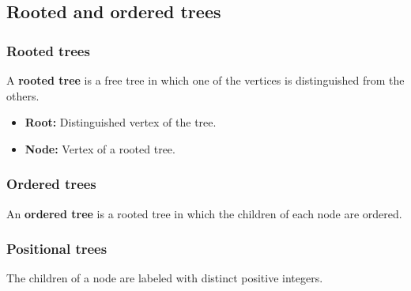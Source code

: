 \subsection{Rooted and ordered trees}
    \subsubsection{Rooted trees}
    \begin{definition}
        A \textbf{rooted tree} is a free tree in which one of the vertices is distinguished from the others.
        \begin{itemize}
            \item \textbf{Root:} Distinguished vertex of the tree.
            \item \textbf{Node:} Vertex of a rooted tree.
        \end{itemize}
    \end{definition}
    
    \subsubsection{Ordered trees}
    \begin{definition}
        An \textbf{ordered tree} is a rooted tree in which the children of each node are ordered.
    \end{definition}


    \subsubsection{Positional trees}
    \begin{definition}
        The children of a node are labeled with distinct positive integers.
    \end{definition}